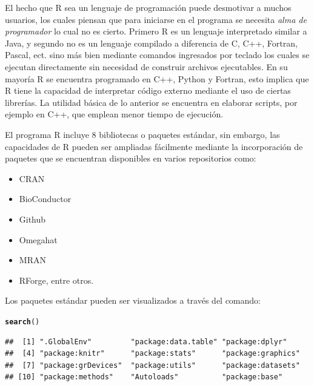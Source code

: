 \documentclass[11pt,a4paper,oneside]{book}\usepackage[]{graphicx}\usepackage[]{color}
\makeatletter
\newcommand{\hlstd}[1]{\textcolor[rgb]{0.345,0.345,0.345}{#1}}%
\newcommand{\hlkwd}[1]{\textcolor[rgb]{0.737,0.353,0.396}{\textbf{#1}}}%
\newenvironment{kframe}{%
 \def\at@end@of@kframe{}%
 \ifinner\ifhmode%
  \def\at@end@of@kframe{\end{minipage}}%
  \begin{minipage}{\columnwidth}%
 \fi\fi%
 \def\FrameCommand##1{\hskip\@totalleftmargin \hskip-\fboxsep
 \colorbox{shadecolor}{##1}\hskip-\fboxsep
     \hskip-\linewidth \hskip-\@totalleftmargin \hskip\columnwidth}%
 \MakeFramed {\advance\hsize-\width
   \@totalleftmargin\z@ \linewidth\hsize
   \@setminipage}}%
 {\par\unskip\endMakeFramed%
 \at@end@of@kframe}
\newenvironment{knitrout}{}{} %
\makeatother
\begin{document}
El hecho que R sea un lenguaje de programación puede desmotivar a muchos usuarios, los cuales piensan que para iniciarse en el programa se necesita \emph{alma de programador} lo cual no es cierto. Primero R es un lenguaje interpretado similar a Java, y segundo no es un lenguaje compilado a diferencia de C, C++, Fortran, Pascal, ect. sino más bien mediante comandos ingresados por teclado los cuales se ejecutan directamente sin necesidad de construir archivos ejecutables. En su mayoría R se encuentra programado en C++, Python y Fortran, esto implica que R tiene la capacidad de interpretar código externo mediante el uso de ciertas librerías. La utilidad básica de lo anterior se encuentra en elaborar scripts, por ejemplo en C++, que emplean menor tiempo de ejecución.\newline 

El programa R incluye 8 bibliotecas o paquetes estándar, sin embargo, las capacidades de R pueden ser ampliadas fácilmente mediante la incorporación de paquetes que se encuentran disponibles en varios repositorios como:
\begin{multicols}{2}
\begin{itemize}
  \item CRAN
  \item BioConductor
  \item Github
  \item Omegahat
  \item MRAN
  \item RForge, entre otros.
\end{itemize}
\end{multicols}

Los paquetes estándar pueden ser visualizados a través del comando:
\begin{knitrout}
\color{fgcolor}\begin{kframe}
\begin{alltt}
\hlkwd{search}\hlstd{()}
\end{alltt}
\begin{verbatim}
##  [1] ".GlobalEnv"         "package:data.table" "package:dplyr"     
##  [4] "package:knitr"      "package:stats"      "package:graphics"  
##  [7] "package:grDevices"  "package:utils"      "package:datasets"  
## [10] "package:methods"    "Autoloads"          "package:base"
\end{verbatim}
\end{kframe}
\end{knitrout}
\end{document}
